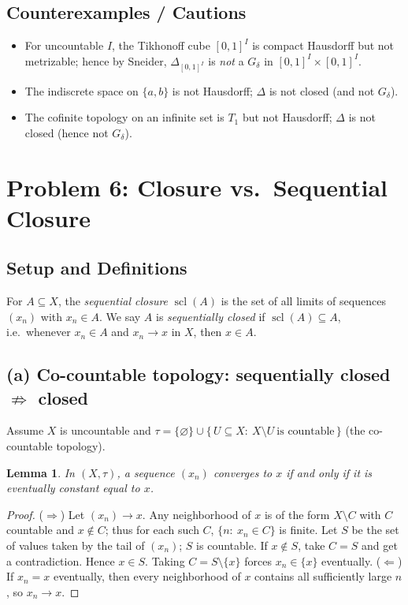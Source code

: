 \documentclass[12pt,a4paper]{article}
\theoremstyle{plain}
\newtheorem{lemma}[theorem]{Lemma}
\theoremstyle{definition}
\theoremstyle{remark}
\theoremstyle{remark}
\begin{document}
	\subsection*{Counterexamples / Cautions}
	\begin{itemize}
		\item For uncountable $I$, the Tikhonoff cube $[0,1]^I$ is compact Hausdorff but not metrizable; hence by Sneider, $\Delta_{[0,1]^I}$ is \emph{not} a $G_\delta$ in $[0,1]^I\times[0,1]^I$.
		\item The indiscrete space on $\{a,b\}$ is not Hausdorff; $\Delta$ is not closed (and not $G_\delta$).
		\item The cofinite topology on an infinite set is $T_1$ but not Hausdorff; $\Delta$ is not closed (hence not $G_\delta$).
	\end{itemize}
	
	\section*{Problem 6: Closure vs.\ Sequential Closure}
	
	\subsection*{Setup and Definitions}
	For $A\subseteq X$, the \emph{sequential closure} $\operatorname{scl}(A)$ is the set of all limits of sequences $(x_n)$ with $x_n\in A$.
	We say $A$ is \emph{sequentially closed} if $\operatorname{scl}(A)\subseteq A$, i.e.\ whenever $x_n\in A$ and $x_n\to x$ in $X$, then $x\in A$.
	
	\subsection*{(a) Co-countable topology: sequentially closed $\not\Rightarrow$ closed}
	Assume $X$ is uncountable and $\tau=\{\varnothing\}\cup\{\,U\subseteq X:\ X\setminus U\ \text{is countable}\,\}$ (the co-countable topology).
	
	\begin{lemma}
		In $(X,\tau)$, a sequence $(x_n)$ converges to $x$ if and only if it is eventually constant equal to $x$.
	\end{lemma}
	\begin{proof}
		($\Rightarrow$) Let $(x_n)\to x$. Any neighborhood of $x$ is of the form $X\setminus C$ with $C$ countable and $x\notin C$; thus for each such $C$, $\{n:\ x_n\in C\}$ is finite.
		Let $S$ be the set of values taken by the tail of $(x_n)$; $S$ is countable. If $x\notin S$, take $C=S$ and get a contradiction. Hence $x\in S$. Taking $C=S\setminus\{x\}$ forces $x_n\in\{x\}$ eventually.
		($\Leftarrow$) If $x_n=x$ eventually, then every neighborhood of $x$ contains all sufficiently large $n$, so $x_n\to x$.
	\end{proof}
	
\end{document}
